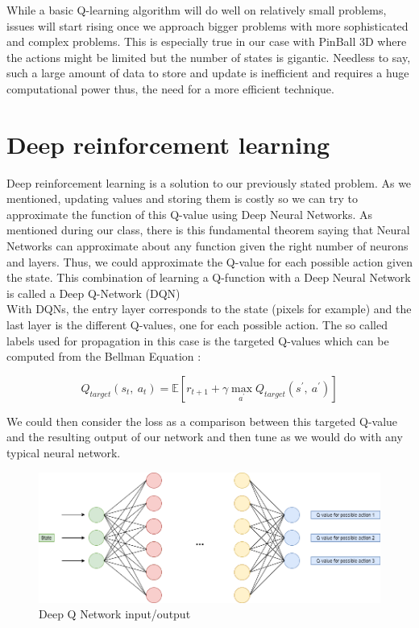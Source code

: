 \documentclass[a4paper,12pt,calibri,oneside,openany]{book}
\theoremstyle{break}
\begin{document}
While a basic Q-learning algorithm will do well on relatively small problems, issues will start rising once we approach bigger problems with more sophisticated and complex problems. This is especially true in our case with PinBall 3D where the actions might be limited but the number of states is gigantic. Needless to say, such a large amount of data to store and update is inefficient and requires a huge computational power thus, the need for a more efficient technique.
\section{Deep reinforcement learning}
\qquad Deep reinforcement learning is a solution to our previously stated problem. As we mentioned, updating values and storing them is costly so we can try to approximate the function of this Q-value using Deep Neural Networks. As mentioned during our class, there is this fundamental theorem saying that Neural Networks can approximate about any function given the right number of neurons and layers. Thus, we could approximate the Q-value for each possible action given the state. This combination of learning a Q-function with a Deep Neural Network is called a Deep Q-Network (DQN)\\
\clearpage
With DQNs, the entry layer corresponds to the state (pixels for example) and the last layer is the different Q-values, one for each possible action. The so called labels used for propagation in this case is the targeted Q-values which can be computed from the Bellman Equation :

$$
Q_{target} (s_t,\ a_t)=\mathbb{E}\left[ r_{t+1}+\gamma \max_{a^{'}} Q_{target}(s^{'},\ a^{'}) \right] 
$$

We could then consider the loss as a comparison between this targeted Q-value and the resulting output of our network and then tune as we would do with any typical neural network.\\

\begin{figure}[H]
	\centering\includegraphics[width=\linewidth]{DQN}
	\caption{Deep Q Network input/output}
\end{figure}
\end{document}
